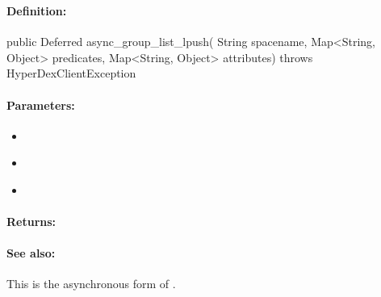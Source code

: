 \pagebreak
\subsubsection{}
\label{api:java:async_group_list_lpush}


\paragraph{Definition:}
\begin{javacode}
public Deferred async_group_list_lpush(
        String spacename,
        Map<String, Object> predicates,
        Map<String, Object> attributes) throws HyperDexClientException
\end{javacode}

\paragraph{Parameters:}
\begin{itemize}[noitemsep]
\item {}\\

\item {}\\

\item {}\\

\end{itemize}

\paragraph{Returns:}


\paragraph{See also:}  This is the asynchronous form of .

\pagebreak
\subsubsection{}
\label{api:java:list_rpush}



